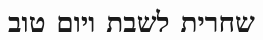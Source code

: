 \documentclass[twoside, openany, parskip=half, 11pt]{book}
\begin{document}

%
%
%
%
%
%
%
%
%
%

%
%
\chapter[שחרית לשבת ויום טוב]{ שחרית לשבת ויום טוב }
\end{document}
